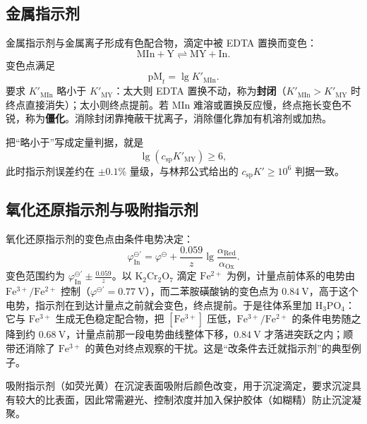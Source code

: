 \documentclass[UTF8]{ctexbook}
\begin{document}
\subsection{金属指示剂}

金属指示剂与金属离子形成有色配合物，滴定中被 EDTA 置换而变色：
\[
\mathrm{MIn}+\mathrm{Y}\rightleftharpoons\mathrm{MY}+\mathrm{In}.
\]
变色点满足
\[
\mathrm{pM}_t=\lg K'_{\mathrm{MIn}}.
\]
要求 $K'_{\mathrm{MIn}}$ 略小于 $K'_{\mathrm{MY}}$：太大则 EDTA 置换不动，称为\textbf{封闭}（$K'_{\mathrm{MIn}}>K'_{\mathrm{MY}}$ 时终点直接消失）；太小则终点提前。若 $\mathrm{MIn}$ 难溶或置换反应慢，终点拖长变色不锐，称为\textbf{僵化}。消除封闭靠掩蔽干扰离子，消除僵化靠加有机溶剂或加热。

把“略小于”写成定量判据，就是
\[
\lg\left(c_{\mathrm{sp}}K'_{\mathrm{MY}}\right)\ge6,
\]
此时指示剂误差约在 $\pm0.1\%$ 量级，与林邦公式给出的 $c_{\mathrm{sp}}K'\ge10^{6}$ 判据一致。

\subsection{氧化还原指示剂与吸附指示剂}

氧化还原指示剂的变色点由条件电势决定：
\[
\varphi_{\mathrm{In}}^{\ominus'}=\varphi^{\ominus}+\frac{0.059}{z}\lg\frac{\alpha_{\mathrm{Red}}}{\alpha_{\mathrm{Ox}}}.
\]
变色范围约为 $\varphi_{\mathrm{In}}^{\ominus'}\pm\frac{0.059}{z}$。以 $\mathrm{K_2Cr_2O_7}$ 滴定 $\mathrm{Fe^{2+}}$ 为例，计量点前体系的电势由 $\mathrm{Fe^{3+}/Fe^{2+}}$ 控制（$\varphi^{\ominus'}=0.77\ \mathrm{V}$），而二苯胺磺酸钠的变色点为 $0.84\ \mathrm{V}$，高于这个电势，指示剂在到达计量点之前就会变色，终点提前。于是往体系里加 $\mathrm{H_3PO_4}$：它与 $\mathrm{Fe^{3+}}$ 生成无色稳定配合物，把 $[\mathrm{Fe^{3+}}]$ 压低，$\mathrm{Fe^{3+}/Fe^{2+}}$ 的条件电势随之降到约 $0.68\ \mathrm{V}$，计量点前那一段电势曲线整体下移，$0.84\ \mathrm{V}$ 才落进突跃之内；顺带还消除了 $\mathrm{Fe^{3+}}$ 的黄色对终点观察的干扰。这是“改条件去迁就指示剂”的典型例子。

吸附指示剂（如荧光黄）在沉淀表面吸附后颜色改变，用于沉淀滴定，要求沉淀具有较大的比表面，因此常需避光、控制浓度并加入保护胶体（如糊精）防止沉淀凝聚。
\end{document}
